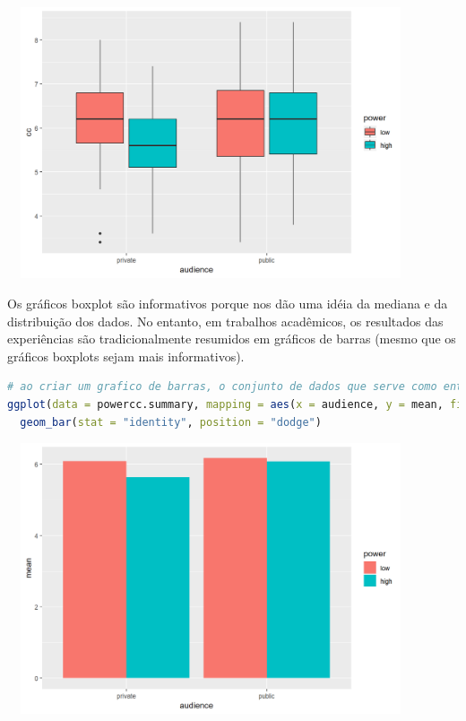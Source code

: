\documentclass{article}
\begin{document}
\begin{center}
\includegraphics[width=12cm,height=8cm]{bda_boxplot-1.png}
\end{center}

Os gráficos boxplot são informativos porque nos dão uma idéia da mediana e da distribuição dos dados. No entanto, em trabalhos acadêmicos, os resultados das experiências são tradicionalmente resumidos em gráficos de barras (mesmo que os gráficos boxplots sejam mais informativos).

\begin{lstlisting}[language=R]
# ao criar um grafico de barras, o conjunto de dados que serve como entrada para o ggplot eh o resumo com os meios, nao o conjunto de dados completo
ggplot(data = powercc.summary, mapping = aes(x = audience, y = mean, fill = power)) +
  geom_bar(stat = "identity", position = "dodge")
\end{lstlisting}


\begin{center}
\includegraphics[width=12cm,height=8cm]{bda_barplot-1.png}
\end{center}
\end{document}
